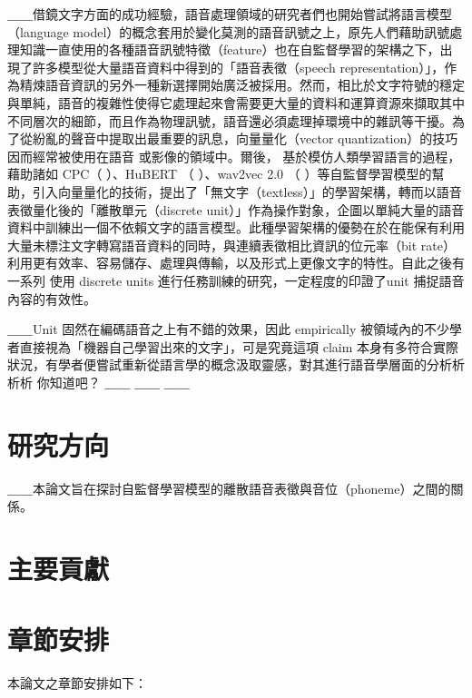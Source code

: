＿＿借鏡文字方面的成功經驗，語音處理領域的研究者們也開始嘗試將語言模型（language model）的概念套用於變化莫測的語音訊號之上，原先人們藉助訊號處理知識一直使用的各種語音訊號特徵（feature）也在自監督學習的架構之下，出現了許多模型從大量語音資料中得到的「語音表徵（speech representation）」，作為精煉語音資訊的另外一種新選擇開始廣泛被採用。然而，相比於文字符號的穩定與單純，語音的複雜性使得它處理起來會需要更大量的資料和運算資源來擷取其中不同層次的細節，而且作為物理訊號，語音還必須處理掉環境中的雜訊等干擾。為了從紛亂的聲音中提取出最重要的訊息，向量量化（vector quantization）的技巧因而經常被使用在語音 \cite{chorowski2019unsupervised, chen2023vector, zhao2023speech} 或影像的領域中。爾後， \cite{lakhotia2021generative}  基於模仿人類學習語言的過程，藉助諸如 CPC（\cite{oord2019representation} ）、HuBERT （\cite{hsu2021hubert} ）、wav2vec 2.0 （\cite{baevski2020wav2vec} ）等自監督學習模型的幫助，引入向量量化的技術，提出了「無文字（textless）」的學習架構，轉而以語音表徵量化後的「離散單元（discrete unit）」作為操作對象，企圖以單純大量的語音資料中訓練出一個不依賴文字的語言模型。此種學習架構的優勢在於在能保有利用大量未標注文字轉寫語音資料的同時，與連續表徵相比資訊的位元率（bit rate）利用更有效率、容易儲存、處理與傳輸，以及形式上更像文字的特性。自此之後有一系列   使用 discrete units 進行任務訓練的研究，一定程度的印證了unit 捕捉語音內容的有效性。

＿＿Unit 固然在編碼語音之上有不錯的效果，因此 empirically 被領域內的不少學者直接視為「機器自己學習出來的文字」，可是究竟這項 claim 本身有多符合實際狀況，有學者便嘗試重新從語言學的概念汲取靈感，對其進行語音學層面的分析析析析 你知道吧？
＿＿
＿＿
＿＿


\section{研究方向}

＿＿本論文旨在探討自監督學習模型的離散語音表徵與音位（phoneme）之間的關係。

\section{主要貢獻}
\section{章節安排}

本論文之章節安排如下：
